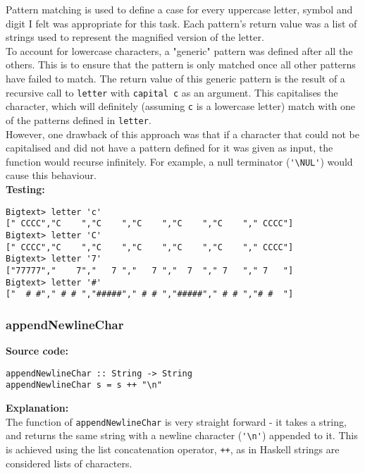 \documentclass[11pt]{article}
\begin{document}
Pattern matching is used to define a case for every uppercase letter, symbol and digit I felt was appropriate for this task. Each pattern's return value was a list of strings used  to represent the magnified version of the letter. \\

To account for lowercase characters, a "generic" pattern was defined after all the others. This is to ensure that the pattern is only matched once all other patterns have failed to match. The return value of this generic pattern is the result of a recursive call to {\verb|letter|} with {\verb|capital c|} as an argument. This capitalises the character, which will definitely (assuming {\verb|c|} is a lowercase letter) match with one of the patterns defined in {\verb|letter|}. \\

However, one drawback of this approach was that if a character that could not be capitalised and did not have a pattern defined for it was given as input, the function would recurse infinitely. For example, a null terminator ({\verb|'\NUL'|}) would cause this behaviour.  \\

\newpage
\textbf{Testing:}
\begin{verbatim}
Bigtext> letter 'c'
[" CCCC","C    ","C    ","C    ","C    ","C    "," CCCC"]
Bigtext> letter 'C'
[" CCCC","C    ","C    ","C    ","C    ","C    "," CCCC"]
Bigtext> letter '7'
["77777","    7","   7 ","   7 ","  7  "," 7   "," 7   "]
Bigtext> letter '#'
["  # #"," # # ","#####"," # # ","#####"," # # ","# #  "]
\end{verbatim}


\subsubsection{appendNewlineChar}
\textbf{Source code:}
\begin{verbatim}
appendNewlineChar :: String -> String
appendNewlineChar s = s ++ "\n"
\end{verbatim}


\textbf{Explanation:}\\
The function of {\verb|appendNewlineChar|} is very straight forward - it takes a string, and returns the same string with a newline character (\verb|'\n'|) appended to it. This is achieved using the list concatenation operator, {\verb|++|}, as in Haskell strings are considered lists of characters.\\
\end{document}
